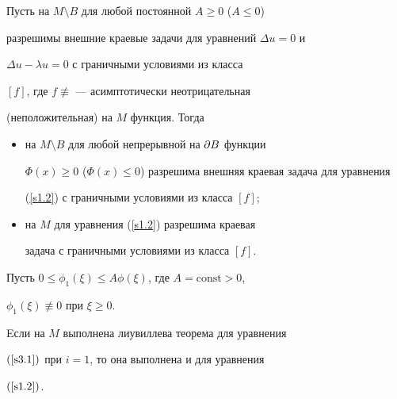 \begin{cors}


Пусть на $M\setminus B$ для любой постоянной $A\geq0$ ($A\leq0$)


разрешимы внешние краевые задачи для уравнений $\Delta u=0$ и


$\Delta u-\lambda u=0$ с граничными условиями из класса


$[f]$, где $f\not\equiv$ --- асимптотически неотрицательная


(неположительная) на $M$ функция. Тогда


\begin{itemize}


\item[1)] на $M\setminus B$ для любой непрерывной на $\partial{B}$ функции


$\Phi(x)\geq0$ ($\Phi(x)\leq0$) разрешима внешняя краевая задача для уравнения


(\ref{s1.2}) с граничными условиями из класса $[f]$;


\item[2)] на $M$ для уравнения (\ref{s1.2}) разрешима краевая


задача с граничными условиями из класса $[f]$.


\end{itemize}


\end{cors}








\begin{thms}\label{th1.4}


Пусть $0\leq\phi_1(\xi)\leq A\phi(\xi)$, где $A=\mathrm{const}>0$,


$\phi_1(\xi)\not\equiv 0$ при $\xi\geq0$.


Eсли на $M$ выполнена лиувиллева теорема для уравнения


$(\ref{s3.1})$ при $i=1$, то она выполнена и для уравнения


$(\ref{s1.2})$. 


\end{thms}








